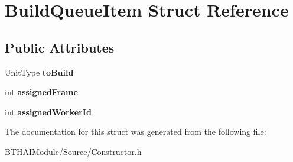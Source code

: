 \hypertarget{struct_build_queue_item}{\section{Build\-Queue\-Item Struct Reference}
\label{struct_build_queue_item}
}
\subsection*{Public Attributes}
\begin{DoxyCompactItemize}
\item 
\hypertarget{struct_build_queue_item_aee8107ff99941bab2ce0c82a05366fcc}{Unit\-Type {\bfseries to\-Build}}\label{struct_build_queue_item_aee8107ff99941bab2ce0c82a05366fcc}

\item 
\hypertarget{struct_build_queue_item_ac008e6785c68cb16d1579145bcb74f9e}{int {\bfseries assigned\-Frame}}\label{struct_build_queue_item_ac008e6785c68cb16d1579145bcb74f9e}

\item 
\hypertarget{struct_build_queue_item_ae537c974ba17c720f333c745bb3937de}{int {\bfseries assigned\-Worker\-Id}}\label{struct_build_queue_item_ae537c974ba17c720f333c745bb3937de}

\end{DoxyCompactItemize}


The documentation for this struct was generated from the following file\-:\begin{DoxyCompactItemize}
\item 
B\-T\-H\-A\-I\-Module/\-Source/Constructor.\-h\end{DoxyCompactItemize}
